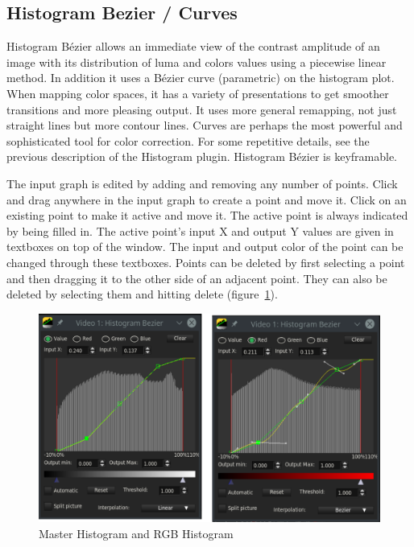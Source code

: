 \subsection{Histogram Bezier / Curves}%
\label{sub:histogram_bezier_curves}

Histogram Bézier allows an immediate view of the contrast amplitude of an image with its distribution of luma and colors values using a piecewise linear method. In addition it uses a Bézier curve (parametric) on the histogram plot. When mapping color spaces, it has a variety of presentations to get smoother transitions and more pleasing output. It uses more general remapping, not just straight lines but more contour lines. Curves are perhaps the most powerful and sophisticated tool for color correction. For some repetitive details, see the previous description of the Histogram plugin. Histogram Bézier is keyframable. 

The input graph is edited by adding and removing any number of points. Click and drag anywhere in the input graph to create a point and move it. Click on an existing point to make it active and move it. The active point is always indicated by being filled in. The active point's input X and output Y values are given in textboxes on top of the window. The input and output color of the point can be changed through these textboxes. Points can be deleted by first selecting a point and then dragging it to the other side of an adjacent point. They can also be deleted by selecting them and hitting delete (figure~\ref{fig:bezier}).

\begin{figure}[htpb]
    \centering
    \includegraphics[width=0.8\linewidth]{images/bezier.png}
    \caption{Master Histogram and RGB Histogram}
    \label{fig:bezier}
\end{figure}

